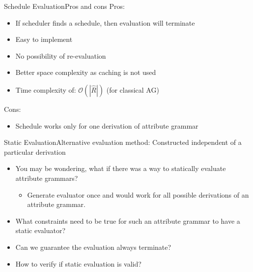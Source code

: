 



\begin{frame}{Schedule Evaluation}{Pros and cons}
Pros:
\begin{itemize}
    \item If scheduler finds a schedule, then evaluation \alert{will terminate}
    \item Easy to implement
    \item \alert{No possibility of re-evaluation}
    \item Better space complexity as caching is not used
    \item Time complexity of: $\mathcal{O}(| \hat{R} |)$ (for classical AG)
\end{itemize}

Cons:
\begin{itemize}
    \item Schedule \alert{works only for one derivation} of attribute grammar
\end{itemize}
\end{frame}







\begin{frame}{Static Evaluation}{Alternative evaluation method: Constructed independent of a particular derivation}

\begin{itemize}
    \item You may be wondering, what if there was a way to \alert{statically} evaluate attribute grammars?
    \begin{itemize}
        \item Generate evaluator \alert{once} and would \alert{work for all possible derivations} of an attribute grammar.
    \end{itemize}
    \item What \alert{constraints} need to be true for such an attribute grammar to have a static evaluator?
    \item Can we guarantee the evaluation always \alert{terminate}?
    \item How to verify if static evaluation is \alert{valid}?
\end{itemize}
\end{frame}

